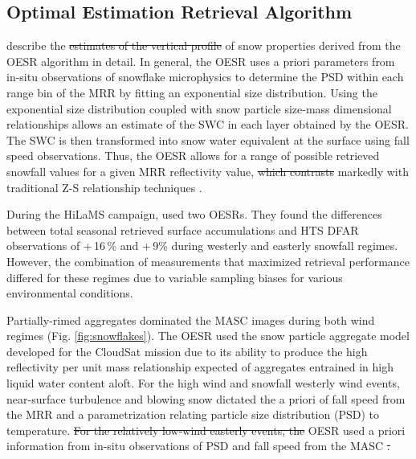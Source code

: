 \documentclass{ametsocV5}
\providecommand{\DIFadd}[1]{{\protect\color{blue}\uwave{#1}}} %
\providecommand{\DIFdel}[1]{{\protect\color{red}\sout{#1}}}                      %
\providecommand{\DIFaddbegin}{} %
\providecommand{\DIFaddend}{} %
\providecommand{\DIFdelbegin}{} %
\providecommand{\DIFdelend}{} %
\newcommand{\DIFscaledelfig}{0.5}
\newlength{\DIFdelgraphicswidth} %
\newlength{\DIFdelgraphicsheight} %
\newcommand{\DIFaddincludegraphics}[2][]{{\color{blue}\fbox{\DIFOincludegraphics[#1]{#2}}}} %
\newcommand{\DIFdelincludegraphics}[2][]{%
\sbox{\DIFdelgraphicsbox}{\DIFOincludegraphics[#1]{#2}}%
\settoboxwidth{\DIFdelgraphicswidth}{\DIFdelgraphicsbox} %
\settoboxtotalheight{\DIFdelgraphicsheight}{\DIFdelgraphicsbox} %
\scalebox{\DIFscaledelfig}{%
\parbox[b]{\DIFdelgraphicswidth}{\usebox{\DIFdelgraphicsbox}\\[-\baselineskip] \rule{\DIFdelgraphicswidth}{0em}}\llap{\resizebox{\DIFdelgraphicswidth}{\DIFdelgraphicsheight}{%
\setlength{\unitlength}{\DIFdelgraphicswidth}%
\begin{picture}(1,1)%
\thicklines\linethickness{2pt} %
{\color[rgb]{1,0,0}\put(0,0){\framebox(1,1){}}}%
{\color[rgb]{1,0,0}\put(0,0){\line( 1,1){1}}}%
{\color[rgb]{1,0,0}\put(0,1){\line(1,-1){1}}}%
\end{picture}%
}\hspace*{3pt}}} %
} %
\DeclareRobustCommand{\DIFaddbegin}{\DIFOaddbegin \let\includegraphics\DIFaddincludegraphics} %
\DeclareRobustCommand{\DIFaddend}{\DIFOaddend \let\includegraphics\DIFOincludegraphics} %
\DeclareRobustCommand{\DIFdelbegin}{\DIFOdelbegin \let\includegraphics\DIFdelincludegraphics} %
\DeclareRobustCommand{\DIFdelend}{\DIFOaddend \let\includegraphics\DIFOincludegraphics} %
\begin{document}
	\subsection{Optimal Estimation Retrieval Algorithm}\label{sec:methodology:oesr}
		\citet{schirle_estimation_2019} describe the \DIFdelbegin \DIFdel{estimates of the vertical profile }\DIFdelend \DIFaddbegin \DIFadd{vertical profile estimates }\DIFaddend of snow properties derived from the OESR algorithm in detail. In general, the OESR uses a priori parameters from in-situ observations of snowflake microphysics to determine the PSD within each range bin of the MRR by fitting an exponential size distribution. Using the exponential size distribution coupled with snow particle size-mass dimensional relationships allows an estimate of the SWC in each layer obtained by the OESR. The SWC is then transformed into snow water equivalent at the surface using fall speed observations. Thus, the OESR allows for a range of possible retrieved snowfall values for a given MRR reflectivity value, \DIFdelbegin \DIFdel{which contrasts }\DIFdelend \DIFaddbegin \DIFadd{contrasting }\DIFaddend markedly with traditional Z-S relationship techniques \citep{friedrich_quantifying_2020}.  

		During the HiLaMS campaign, \citet{schirle_estimation_2019} used two OESRs. They found the differences between total seasonal retrieved surface accumulations and HTS DFAR observations of +\,16\,\% and +\,9\% during westerly and easterly snowfall regimes. However, the combination of measurements that maximized retrieval performance differed for these regimes due to variable sampling biases for various environmental conditions. 

		Partially-rimed aggregates dominated the MASC images during both wind regimes (Fig. \ref{fig:snowflakes}). The OESR used the snow particle aggregate model \citep{wood_microphysical_2015} developed for the CloudSat mission due to its ability to produce the high reflectivity per unit mass relationship expected of aggregates entrained in high liquid water content aloft. For the high wind and snowfall westerly wind events, near-surface turbulence and blowing snow dictated the a priori of fall speed from the MRR and a parametrization relating particle size distribution (PSD) to temperature. \DIFdelbegin \DIFdel{For the relatively low-wind easterly events, the }\DIFdelend \DIFaddbegin \DIFadd{The }\DIFaddend OESR used a priori information from in-situ observations of PSD and fall speed from the MASC \DIFdelbegin \DIFdel{. 
		}%
\end{document}

